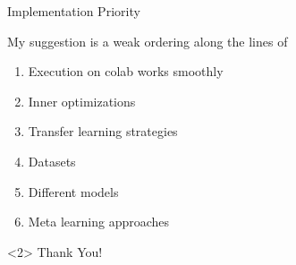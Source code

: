 \documentclass[aspectratio=169,12pt,handout]{beamer}
\begin{document}
\begin{frame}{Implementation Priority}

My suggestion is a weak ordering along the lines of

\begin{enumerate}
    \item Execution on colab works smoothly
    \item Inner optimizations
    \item Transfer learning strategies
    \item Datasets
    \item Different models
    \item Meta learning approaches
\end{enumerate}

\begin{block}<2>{}
\centering Thank You!
\end{block}

\end{frame}



\end{document}
